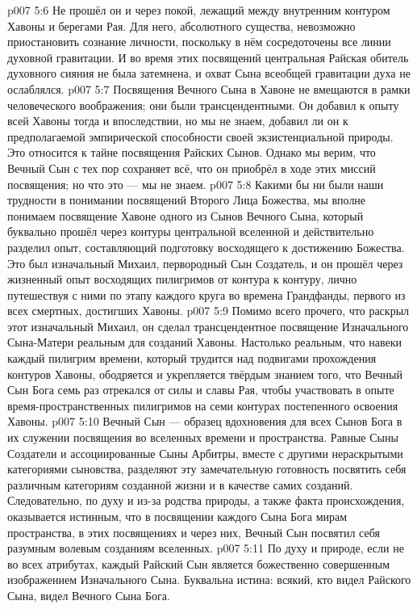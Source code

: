 \vs p007 5:6 Не прошёл он и через покой, лежащий между внутренним контуром Хавоны и берегами Рая. Для него, абсолютного существа, невозможно приостановить сознание личности, поскольку в нём сосредоточены все линии духовной гравитации. И во время этих посвящений центральная Райская обитель духовного сияния не была затемнена, и охват Сына всеобщей гравитации духа не ослаблялся.
\vs p007 5:7 \pc Посвящения Вечного Сына в Хавоне не вмещаются в рамки человеческого воображения; они были трансцендентными. Он добавил к опыту всей Хавоны тогда и впоследствии, но мы не знаем, добавил ли он к предполагаемой эмпирической способности своей экзистенциальной природы. Это относится к тайне посвящения Райских Сынов. Однако мы верим, что Вечный Сын с тех пор сохраняет всё, что он приобрёл в ходе этих миссий посвящения; но что это --- мы не знаем.
\vs p007 5:8 \pc Какими бы ни были наши трудности в понимании посвящений Второго Лица Божества, мы вполне понимаем посвящение Хавоне одного из Сынов Вечного Сына, который буквально прошёл через контуры центральной вселенной и действительно разделил опыт, составляющий подготовку восходящего к достижению Божества. Это был изначальный Михаил, первородный Сын Создатель, и он прошёл через жизненный опыт восходящих пилигримов от контура к контуру, лично путешествуя с ними по этапу каждого круга во времена Грандфанды, первого из всех смертных, достигших Хавоны.
\vs p007 5:9 Помимо всего прочего, что раскрыл этот изначальный Михаил, он сделал трансцендентное посвящение Изначального Сына\hyp{}Матери реальным для созданий Хавоны. Настолько реальным, что навеки каждый пилигрим времени, который трудится над подвигами прохождения контуров Хавоны, ободряется и укрепляется твёрдым знанием того, что Вечный Сын Бога семь раз отрекался от силы и славы Рая, чтобы участвовать в опыте время\hyp{}пространственных пилигримов на семи контурах постепенного освоения Хавоны.
\vs p007 5:10 \pc Вечный Сын --- образец вдохновения для всех Сынов Бога в их служении посвящения во вселенных времени и пространства. Равные Сыны Создатели и ассоциированные Сыны Арбитры, вместе с другими нераскрытыми категориями сыновства, разделяют эту замечательную готовность посвятить себя различным категориям созданной жизни и в качестве самих созданий. Следовательно, по духу и из\hyp{}за родства природы, а также факта происхождения, оказывается истинным, что в посвящении каждого Сына Бога мирам пространства, в этих посвящениях и через них, Вечный Сын посвятил себя разумным волевым созданиям вселенных.
\vs p007 5:11 По духу и природе, если не во всех атрибутах, каждый Райский Сын является божественно совершенным изображением Изначального Сына. Буквальна истина: всякий, кто видел Райского Сына, видел Вечного Сына Бога.

